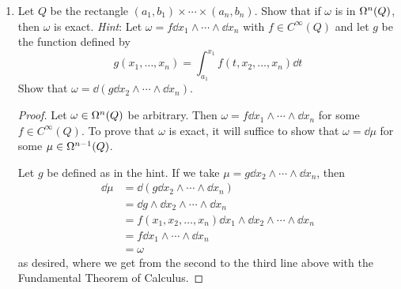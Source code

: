 \documentclass[../psets.tex]{subfiles}
\begin{document}
\begin{enumerate}[label={\textbf{2.4.\roman*.}}]
\begin{enumerate}
        \begin{proof}
            Since $\dd{x_1}=\dd(x_1)$, we have by part (1) that
            \begin{equation*}
                \boxed{\mu = x_1\omega}
            \end{equation*}
        \end{proof}
    \end{enumerate}
    \item Let $Q$ be the rectangle $(a_1,b_1)\times\cdots\times(a_n,b_n)$. Show that if $\omega$ is in $\ome[n]{Q}$, then $\omega$ is exact. \emph{Hint}: Let $\omega=f\dd{x_1}\wedge\cdots\wedge\dd{x_n}$ with $f\in C^\infty(Q)$ and let $g$ be the function defined by
    \begin{equation*}
        g(x_1,\dots,x_n) = \int_{a_1}^{x_1}f(t,x_2,\dots,x_n)\dd{t}
    \end{equation*}
    Show that $\omega=\dd(g\dd{x_2}\wedge\cdots\wedge\dd{x_n})$.
    \begin{proof}
        Let $\omega\in\ome[n]{Q}$ be arbitrary. Then $\omega=f\dd{x_1}\wedge\cdots\wedge\dd{x_n}$ for some $f\in C^\infty(Q)$. To prove that $\omega$ is exact, it will suffice to show that $\omega=\dd\mu$ for some $\mu\in\ome[n-1]{Q}$.\par
        Let $g$ be defined as in the hint. If we take $\mu=g\dd{x_2}\wedge\cdots\wedge\dd{x_n}$, then
        \begin{align*}
            \dd\mu &= \dd(g\dd{x_2}\wedge\cdots\wedge\dd{x_n})\\
            &= \dd{g}\wedge\dd{x_2}\wedge\cdots\wedge\dd{x_n}\\
            &= f(x_1,x_2,\dots,x_n)\dd{x_1}\wedge\dd{x_2}\wedge\cdots\wedge\dd{x_n}\\
            &= f\dd{x_1}\wedge\cdots\wedge\dd{x_n}\\
            &= \omega
        \end{align*}
        as desired, where we get from the second to the third line above with the Fundamental Theorem of Calculus.
    \end{proof}
\end{enumerate}
\end{document}
